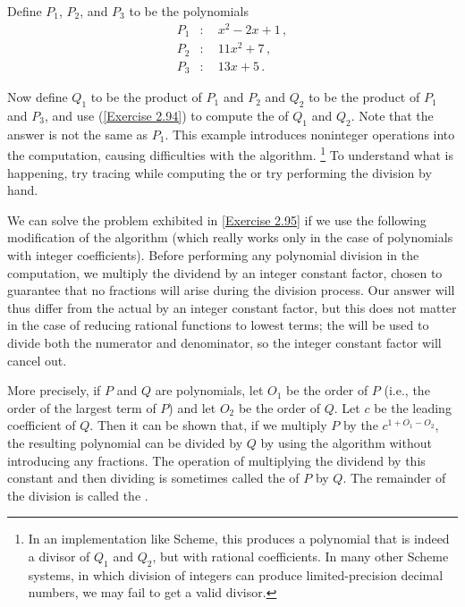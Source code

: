 \begin{exercise}
	\label{Exercise 2.95}
	Define \( P_1 \), \( P_2 \), and \( P_3 \) to be the polynomials
	\begin{align*}
		P_1 &: \quad x^2 - 2 x + 1 \,,  \\
		P_2 &: \quad 11 x^2 + 7 \,,     \\
		P_3 &: \quad 13 x + 5 \,.
	\end{align*}

	Now define \( Q_1 \) to be the product of \( P_1 \) and \( P_2 \) and \( Q_2 \) to be the product of \( P_1 \) and \( P_3 \), and use  (\cref{Exercise 2.94}) to compute the  of \( Q_1 \) and \( Q_2 \).
	Note that the answer is not the same as \( P_1 \).
	This example introduces noninteger operations into the computation, causing difficulties with the  algorithm.%
	\footnote{
		In an implementation like  Scheme, this produces a polynomial that is indeed a divisor of \( Q_1 \) and \( Q_2 \), but with rational coefficients.
		In many other Scheme systems, in which division of integers can produce limited-precision decimal numbers, we may fail to get a valid divisor.
	}
	To understand what is happening, try tracing  while computing the  or try performing the division by hand.
\end{exercise}

We can solve the problem exhibited in \cref{Exercise 2.95} if we use the following modification of the  algorithm (which really works only in the case of polynomials with integer coefficients).
Before performing any polynomial division in the  computation, we multiply the dividend by an integer constant factor, chosen to guarantee that no fractions will arise during the division process.
Our answer will thus differ from the actual  by an integer constant factor, but this does not matter in the case of reducing rational functions to lowest terms;
the  will be used to divide both the numerator and denominator, so the integer constant factor will cancel out.

More precisely, if \( P \) and \( Q \) are polynomials, let \( O_1 \) be the order of \( P \) (i.e., the order of the largest term of \( P \)) and let \( O_2 \) be the order of \( Q \).
Let \( c \) be the leading coefficient of \( Q \).
Then it can be shown that, if we multiply \( P \) by the  \( c^{1 + O_1 - O_2} \), the resulting polynomial can be divided by \( Q \) by using the  algorithm without introducing any fractions.
The operation of multiplying the dividend by this constant and then dividing is sometimes called the  of \( P \) by \( Q \).
The remainder of the division is called the .



